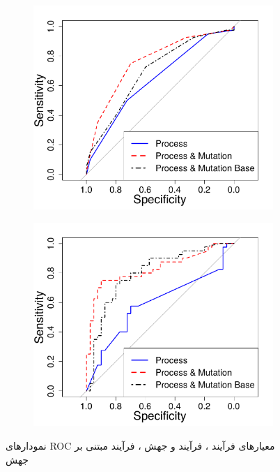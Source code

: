 \begin{figure}[H]
	\begin{subfigure}{.5\textwidth}
		\centering
		\includegraphics[width= \linewidth]{img/evaluation/phase2-part1-roc-lr.pdf}
		\caption{}
	\end{subfigure}
	\begin{subfigure}{.5\textwidth}
		\centering
		\includegraphics[width= \linewidth]{img/evaluation/phase2-part1-roc-nn.pdf}
		\caption{}
	\end{subfigure}
	\caption{نمودارهای ROC معیارهای فرآیند ، فرآیند و جهش ، فرآیند مبتنی بر جهش}
	\label{fig:ROC-phase2-part1}
\end{figure}


